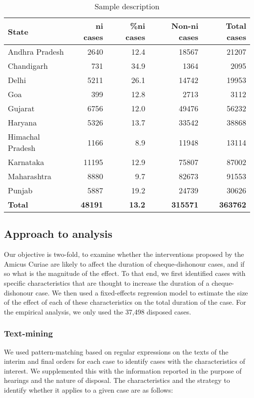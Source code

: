 {\footnotesize \begin{longtable}{@{}lrrrr@{}}
\caption{Sample description}
\label{tab:sample_desc}\\
\toprule
\textbf{State} & \textbf{\gls{ni} cases} & \textbf{\%\gls{ni} cases} & \textbf{Non-\gls{ni} cases} & \textbf{Total cases}\\ \midrule
\endhead
Andhra Pradesh & 2640 & 12.4 & 18567 & 21207\\
Chandigarh & 731 & 34.9 & 1364 & 2095\\
Delhi & 5211 & 26.1 & 14742 & 19953\\
Goa & 399 & 12.8 & 2713 & 3112\\
Gujarat & 6756 & 12.0 & 49476 & 56232\\
Haryana & 5326 & 13.7 & 33542 & 38868\\
Himachal Pradesh & 1166 & 8.9 & 11948 & 13114\\
Karnataka & 11195 & 12.9 & 75807 & 87002\\
Maharashtra & 8880 & 9.7 & 82673 & 91553\\
Punjab & 5887 & 19.2 & 24739 & 30626\\
\textbf{Total} & \textbf{48191} & \textbf{13.2} & \textbf{315571} & \textbf{363762}\\ \bottomrule
\end{longtable}
}

\subsection{Approach to analysis}
\label{sec:approach-analysis}

Our objective is two-fold, to examine whether the interventions proposed by the Amicus Curiae are likely to affect the duration of cheque-dishonour cases, and if so what is the magnitude of the effect. To that end, we first identified cases with specific characteristics that are thought to increase the duration of a cheque-dishonour case. We then used a fixed-effects regression model to estimate the size of the effect of each of these characteristics on the total duration of the case. For the empirical analysis, we only used the 37,498 disposed cases.

\subsubsection{Text-mining}
\label{sec:text-mining}

We used pattern-matching based on regular expressions on the texts of the interim and final orders for each case to identify cases with the characteristics of interest. We supplemented this with the information reported in the purpose of hearings and the nature of disposal. The characteristics and the strategy to identify whether it applies to a given case are as follows:

